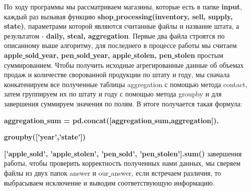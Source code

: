 \documentclass{article}
\begin{document}
По ходу программы мы рассматриваем магазины, которые есть в папке \textbf{input}, 
каждый раз вызывая функцию \textbf{shop\underline{ }processing(inventory, sell, supply, state)}, 
параметрами которой являются считанные файлы и название штата, 
а результатом - \textbf{daily, steal, aggregation}. 
\newline Первые два файла строятся по описанному выше алгоритму, 
для последнего в процессе работы мы считаем \textbf{apple\underline{ }sold\underline{ }year, pen\underline{ }sold\underline{ }year, apple\underline{ }stolen, pen\underline{ }stolen} простым суммированием.
Чтобы получить исходные агрегированные данные об объемах продаж и количестве сворованной продукции 
по штату и году, мы сначала конкатенируем все полученные таблицы aggregation  с помощью метода contact,
затем группируем их по штату и году с помощью метода groupby и для завершения суммируем значения по полям.
\newline В итоге получается такая формула:

\textbf{aggregation\underline{ }sum = pd.concat([aggregation\underline{ }sum,aggregation]).}

\textbf{groupby(['year','state'])}

\textbf{['apple\underline{ }sold', 'apple\underline{ }stolen', 'pen\underline{ }sold', 'pen\underline{ }stolen'].sum()}
 завершения работы, чтобы проверить корректность полученных нами данных, 
мы сверяем файлы из двух папок answer и our\underline{ }answer, 
если встречаем различия, то выбрасываем исключение и выводим соответствующую информацию. 
\end{document}
